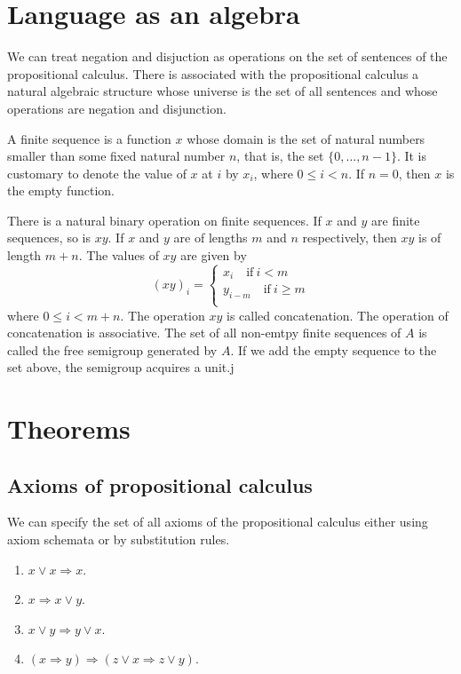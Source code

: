 \documentclass[letterpaper, 10pt]{article}
\newcommand{\set}[1]{\{#1\}}
\renewcommand{\implies}{\Rightarrow}
\begin{document}
\section{Language as an algebra}

We can treat negation and disjuction as operations on the set of sentences of
the propositional calculus. There is associated with the propositional calculus
a natural algebraic structure whose universe is the set of all sentences and
whose operations are negation and disjunction.

A finite sequence is a function $x$ whose domain is the set of natural numbers
smaller than some fixed natural number $n$, that is, the set
$\set{0,\ldots,n-1}$. It is customary to denote the value of $x$ at $i$ by
$x_i$, where $0 \leq i < n$. If $n = 0$, then $x$ is the empty function.

There is a natural binary operation on finite sequences. If $x$ and $y$ are
finite sequences, so is $xy$. If $x$ and $y$ are of lengths $m$ and $n$
respectively, then $xy$ is of length $m + n$. The values of $xy$ are given by
\[
	(xy)_i=
	\begin{cases}
		x_i\quad\textrm{if}\ i < m \\
		y_{i - m}\quad\textrm{if}\ i \geq m \\
	\end{cases}
\]
where $0 \leq i < m + n$. The operation $xy$ is called concatenation. The
operation of concatenation is associative. The set of all non-emtpy finite
sequences of $A$ is called the free semigroup generated by $A$. If we add the
empty sequence to the set above, the semigroup acquires a unit.j


\section{Theorems}

\subsection{Axioms of propositional calculus}

We can specify the set of all axioms of the propositional calculus either using
axiom schemata or by substitution rules.

\begin{enumerate}[label=T\arabic*, left=0pt]
	\item $x \lor x \implies x$.
	\item $x \implies x \lor y$.
	\item $x \lor y \implies y \lor x$.
	\item $(x \implies y) \implies (z\lor x \implies z \lor y)$.
\end{enumerate}
\end{document}
